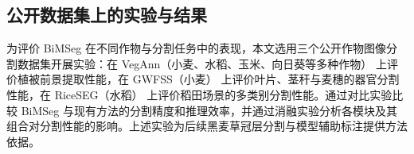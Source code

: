 
\newcommand{\experimentbicaption}[3]{%
  \begingroup
  \captionsetup{position=top,font=methodfive,labelfont=bf,textfont=bf,
    justification=centering,singlelinecheck=false,skip=6pt}%
  \caption[#1]{#1\protect\\Table~\thetable\quad #2}%
  \label{#3}%
  \endgroup
}

\begingroup
{}

\subsection{公开数据集上的实验与结果}
\label{sec:experiments}

为评价 BiMSeg 在不同作物与分割任务中的表现，本文选用三个公开作物图像分割数据集开展实验：在 VegAnn（小麦、水稻、玉米、向日葵等多种作物） 上评价植被前景提取性能，在 GWFSS（小麦） 上评价叶片、茎秆与麦穗的器官分割性能，在 RiceSEG（水稻） 上评价稻田场景的多类别分割性能。通过对比实验比较 BiMSeg 与现有方法的分割精度和推理效率，并通过消融实验分析各模块及其组合对分割性能的影响。上述实验为后续黑麦草冠层分割与模型辅助标注提供方法依据。

